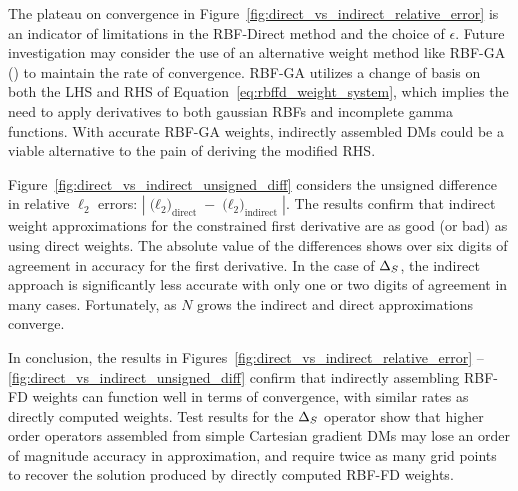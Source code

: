 The plateau on convergence in Figure~\ref{fig:direct_vs_indirect_relative_error} is an indicator of limitations in the RBF-Direct method and the choice of $\epsilon$. Future investigation may consider the use of an alternative weight method like RBF-GA (\cite{Fornberg2012}) to maintain the rate of convergence. RBF-GA utilizes a change of basis on both the LHS and RHS of Equation~\ref{eq:rbffd_weight_system}, which implies the need to apply derivatives to both gaussian RBFs and incomplete gamma functions. With accurate RBF-GA weights, indirectly assembled DMs could be a viable alternative to the pain of deriving the modified RHS. 

Figure~\ref{fig:direct_vs_indirect_unsigned_diff} considers the unsigned difference in relative $\ell_2$ errors: $| \text{($\ell_{2}$)}_{\text{direct}} - \text{($\ell_{2}$)}_{\text{indirect}} |$. The results confirm that indirect weight approximations for the constrained first derivative are as good (or bad) as using direct weights. The absolute value of the differences shows over six digits of agreement in accuracy for the first derivative. In the case of $\Delta_S$, the indirect approach is significantly less accurate with only one or two digits of agreement in many cases. Fortunately, as $N$ grows the indirect and direct approximations converge. 

In conclusion, the results in Figures~\ref{fig:direct_vs_indirect_relative_error} -- \ref{fig:direct_vs_indirect_unsigned_diff} confirm that indirectly assembling RBF-FD weights can function well in terms of convergence, with similar rates as directly computed weights. Test results for the $\Delta_S$ operator show that higher order operators assembled from simple Cartesian gradient DMs may lose an order of magnitude accuracy in approximation, and require twice as many grid points to recover the solution produced by directly computed RBF-FD weights. 




